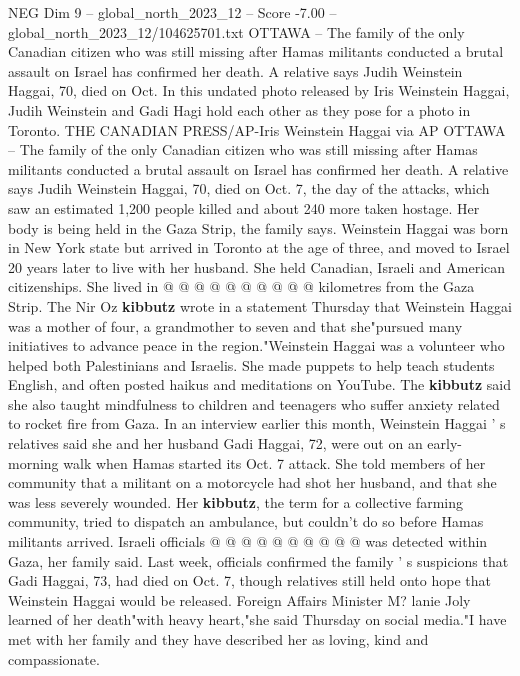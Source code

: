 \begin{textsample}{NEG Dim 9 – global\_north\_2023\_12 – Score -7.00 – global\_north\_2023\_12/104625701.txt}  \label{ex:f9_neg_077}
OTTAWA -- The family of the only Canadian citizen who was still missing after Hamas militants conducted a brutal assault on Israel has confirmed her death.
A relative says Judih Weinstein Haggai, 70, died on Oct.
In this undated photo released by Iris Weinstein Haggai, Judih Weinstein and Gadi Hagi hold each other as they pose for a photo in Toronto.
THE CANADIAN PRESS/AP-Iris Weinstein Haggai via AP OTTAWA -- The family of the only Canadian citizen who was still missing after Hamas militants conducted a brutal assault on Israel has confirmed her death.
A relative says Judih Weinstein Haggai, 70, died on Oct. 7, the day of the attacks, which saw an estimated 1,200 people killed and about 240 more taken hostage.
Her body is being held in the Gaza Strip, the family says.
Weinstein Haggai was born in New York state but arrived in Toronto at the age of three, and moved to Israel 20 years later to live with her husband.
She held Canadian, Israeli and American citizenships.
She lived in @ @ @ @ @ @ @ @ @ @ kilometres from the Gaza Strip.
The Nir Oz \textbf{kibbutz} wrote in a statement Thursday that Weinstein Haggai was a mother of four, a grandmother to seven and that she"pursued many initiatives to advance peace in the region."Weinstein Haggai was a volunteer who helped both Palestinians and Israelis.
She made puppets to help teach students English, and often posted haikus and meditations on YouTube.
The \textbf{kibbutz} said she also taught mindfulness to children and teenagers who suffer anxiety related to rocket fire from Gaza.
In an interview earlier this month, Weinstein Haggai ' s relatives said she and her husband Gadi Haggai, 72, were out on an early-morning walk when Hamas started its Oct. 7 attack.
She told members of her community that a militant on a motorcycle had shot her husband, and that she was less severely wounded.
Her \textbf{kibbutz}, the term for a collective farming community, tried to dispatch an ambulance, but couldn't do so before Hamas militants arrived.
Israeli officials @ @ @ @ @ @ @ @ @ @ was detected within Gaza, her family said.
Last week, officials confirmed the family ' s suspicions that Gadi Haggai, 73, had died on Oct. 7, though relatives still held onto hope that Weinstein Haggai would be released.
Foreign Affairs Minister M? lanie Joly learned of her death"with heavy heart,"she said Thursday on social media."I have met with her family and they have described her as loving, kind and compassionate.

\end{textsample}
